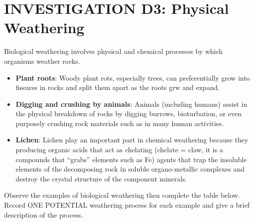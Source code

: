 \documentclass[
  letterpaper,
  twocolumn,
  portrait]{scrbook}
\begin{document}
\hypertarget{investigation-d3-physical-weathering}{%
\section{INVESTIGATION D3: Physical
Weathering}\label{investigation-d3-physical-weathering}}

Biological weathering involves physical and chemical processes by which
organisms weather rocks.

\begin{itemize}
\item
  \textbf{Plant roots}: Woody plant rots, especially trees, can
  preferentially grow into fissures in rocks and split them apart as the
  roots grw and expand.
\item
  \textbf{Digging and crushing by animals}: Animals (including humans)
  assist in the physical breakdown of rocks by digging burrows,
  bioturbation, or even purposely crushing rock materials such as in
  many human activities.
\item
  \textbf{Lichen}: Lichen play an important part in chemical weathering
  because they producing organic acids that act as chelating (chelate =
  claw, it is a compounds that ``grabs'' elements such as Fe) agents
  that trap the insoluble elements of the decomposing rock in soluble
  organo-metallic complexes and destroy the crystal structure of the
  component minerals.
\end{itemize}

Observe the examples of biological weathering then complete the table
below. Record ONE POTENTIAL weathering process for each example and give
a brief description of the process.

 
  \providecommand{\huxb}[2]{\arrayrulecolor[RGB]{#1}\global\arrayrulewidth=#2pt}
  \providecommand{\huxvb}[2]{\color[RGB]{#1}\vrule width #2pt}
  \providecommand{\huxtpad}[1]{\rule{0pt}{#1}}
  \providecommand{\huxbpad}[1]{\rule[-#1]{0pt}{#1}}
\end{document}
